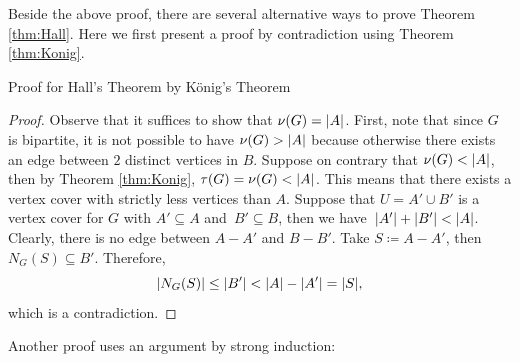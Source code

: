 \documentclass[math]{amznotes}
\theoremstyle{remark}
\newcommand{\0}{\mathbf{0}}
\newcommand{\1}{\mathbf{1}}
\begin{document}
Beside the above proof, there are several alternative ways to prove Theorem \ref{thm:Hall}. Here we first present a proof by contradiction using Theorem \ref{thm:Konig}.
\begin{genbox}{Proof for Hall's Theorem by K\"{o}nig's Theorem}
    \begin{proof}
        Observe that it suffices to show that $\nu(G) = {\left\lvert {A} \right\rvert}$. First, note that since $G$ is bipartite, it is not possible to have $\nu(G) > {\left\lvert {A} \right\rvert}$ because otherwise there exists an edge between $2$ distinct vertices in $B$. Suppose on contrary that $\nu(G) < {\left\lvert {A} \right\rvert}$, then by Theorem \ref{thm:Konig}, $\tau(G) = \nu(G) < {\left\lvert {A} \right\rvert}$. This means that there exists a vertex cover with strictly less vertices than $A$. Suppose that $U = A' \cup B'$ is a vertex cover for $G$ with $A' \subseteq A$ and~$B' \subseteq B$, then we have~${\left\lvert {A'} \right\rvert} + {\left\lvert {B'} \right\rvert} < {\left\lvert {A} \right\rvert}$. Clearly, there is no edge between $A - A'$ and $B - B'$. Take $S \coloneqq A - A'$, then $N_G(S) \subseteq B'$. Therefore,
        \begin{equation*}
            {\left\lvert {N_G(S)} \right\rvert} \leq {\left\lvert {B'} \right\rvert} < {\left\lvert {A} \right\rvert} - {\left\lvert {A'} \right\rvert} = {\left\lvert {S} \right\rvert},
        \end{equation*}
        which is a contradiction.
    \end{proof}
\end{genbox}
Another proof uses an argument by strong induction:
\end{document}
